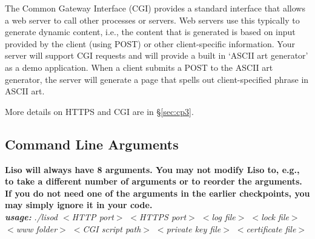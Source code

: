  The Common Gateway Interface (CGI) provides a standard interface that allows a web server to call other processes or servers.  Web servers use this typically to generate dynamic content, i.e., the content that is generated is based on input provided by the client (using POST) or other client-specific information. 
Your server will support CGI requests and will provide a built in `ASCII art generator' as a demo application.
When a client submits a POST to the ASCII art generator, the server will generate a page that spells out client-specified phrase in ASCII art.

\vspace{5pt}

\noindent More details on HTTPS and CGI are in \S\ref{sec:cp3}.
\subsection{Command Line Arguments}
\noindent\textbf{Liso will always have 8 arguments. You may not modify Liso to, e.g., to take a different number of arguments or to reorder the arguments. If you do not need one of the arguments in the earlier checkpoints, you may simply ignore it in your code.}\\

\textbf{\emph{usage:}} \emph{./lisod $<$HTTP port$>$ $<$HTTPS port$>$
                             $<$log file$>$ $<$lock file$>$ $<$www folder$>$
                             $<$CGI script path$>$ $<$private key file$>$ $<$certificate file$>$}

